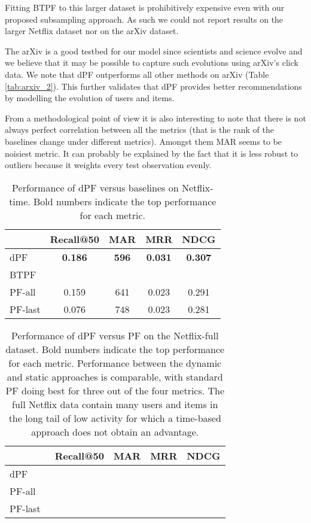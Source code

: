 \documentclass{sig-alternate}
\begin{document}
Fitting BTPF to this larger dataset is prohibitively expensive even with our
proposed subsampling approach. As such we could not report results on the
larger Netflix dataset nor on the arXiv dataset.

The arXiv is a good testbed for our model since scientists and science evolve
and we believe that it may be possible to capture such evolutions using arXiv's
click data. We note that dPF outperforms all other methods on arXiv (Table
\ref{tab:arxiv_2}). This further validates that dPF provides better
recommendations by modelling the evolution of users and items. 

From a methodological point of view it is also interesting to note that there
is not always perfect correlation between all the metrics (that is the rank of
the baselines change under different metrics). Amongst them MAR seems to be
noisiest metric. It can probably be explained by the fact that it is less
robust to outliers because it weights every test observation evenly.



\begin{table}[h]
\begin{center}
\begin{tabular}{p{0.75in}cccc}
\hline
           & Recall@50 & MAR & MRR & NDCG \\ \hline 
dPF        & {\bf 0.186} & {\bf 596} & {\bf 0.031} & {\bf 0.307} \\ 
BTPF \citep{lxiong:10:bptf}   &  &  &  & \\ 
PF-all \citep{Gopalan:2013b}  & 0.159 &  641 & 0.023 & 0.291 \\ 
PF-last \citep{Gopalan:2013b} & 0.076  &  748 & 0.023 & 0.281 \\ \hline
\end{tabular}
\caption{Performance of dPF versus baselines on Netflix-time. Bold numbers
indicate the top performance for each metric.}
\label{tab:netflix_2}
\end{center}
\end{table}

\begin{table}[h]
\begin{center}
\begin{tabular}{p{0.75in}cccc}
\hline
             & Recall@50 & MAR & MRR & NDCG \\ \hline 
dPF          &  & {\bf } &  & \\ 
PF-all~\citep{Gopalan:2013b} & {\bf } & & {\bf } & {\bf } \\ 
PF-last~\citep{Gopalan:2013b} & & & & \\ \hline
\end{tabular}
\caption{Performance of dPF versus PF on the Netflix-full dataset. 
Bold numbers indicate the top performance for each metric. 
Performance between the dynamic and static approaches is comparable, 
with standard PF doing best for three out of the four metrics. 
The full Netflix data contain many users and items in the long tail of low activity for which a time-based approach does not obtain an advantage.}
\label{tab:netflix_full}
\end{center}
\end{table}
\end{document}
